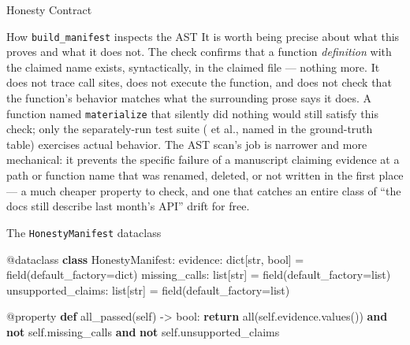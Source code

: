 \documentclass[
  ignorenonframetext,
]{beamer}
\newenvironment{Shaded}{}{}
\newcommand{\AttributeTok}[1]{\textcolor[rgb]{0.49,0.56,0.16}{#1}}
\newcommand{\BuiltInTok}[1]{\textcolor[rgb]{0.00,0.50,0.00}{#1}}
\newcommand{\ControlFlowTok}[1]{\textcolor[rgb]{0.00,0.44,0.13}{\textbf{#1}}}
\newcommand{\KeywordTok}[1]{\textcolor[rgb]{0.00,0.44,0.13}{\textbf{#1}}}
\newcommand{\NormalTok}[1]{#1}
\newcommand{\OperatorTok}[1]{\textcolor[rgb]{0.40,0.40,0.40}{#1}}
\newcommand{\VariableTok}[1]{\textcolor[rgb]{0.10,0.09,0.49}{#1}}
\begin{document}
\begin{frame}{Honesty Contract}
\begin{block}{How \texttt{build\_manifest} inspects the AST}
It is worth being precise about what this proves and what it does not.
The check confirms that a function \emph{definition} with the claimed
name exists, syntactically, in the claimed file --- nothing more. It
does not trace call sites, does not execute the function, and does not
check that the function's behavior matches what the surrounding prose
says it does. A function named \texttt{materialize} that silently did
nothing would still satisfy this check; only the separately-run test
suite ( et al., named in the ground-truth
table) exercises actual behavior. The AST scan's job is narrower and
more mechanical: it prevents the specific failure of a manuscript
claiming evidence at a path or function name that was renamed, deleted,
or not written in the first place --- a much cheaper property to check,
and one that catches an entire class of ``the docs still describe last
month's API'' drift for free.
\end{block}

\begin{block}{The \texttt{HonestyManifest} dataclass}
\protect{}\label{the-honestymanifest-dataclass}
\begin{Shaded}
\begin{Highlighting}[]
\AttributeTok{@dataclass}
\KeywordTok{class}\NormalTok{ HonestyManifest:}
\NormalTok{    evidence: }\BuiltInTok{dict}\NormalTok{[}\BuiltInTok{str}\NormalTok{, }\BuiltInTok{bool}\NormalTok{] }\OperatorTok{=}\NormalTok{ field(default\_factory}\OperatorTok{=}\BuiltInTok{dict}\NormalTok{)}
\NormalTok{    missing\_calls: }\BuiltInTok{list}\NormalTok{[}\BuiltInTok{str}\NormalTok{] }\OperatorTok{=}\NormalTok{ field(default\_factory}\OperatorTok{=}\BuiltInTok{list}\NormalTok{)}
\NormalTok{    unsupported\_claims: }\BuiltInTok{list}\NormalTok{[}\BuiltInTok{str}\NormalTok{] }\OperatorTok{=}\NormalTok{ field(default\_factory}\OperatorTok{=}\BuiltInTok{list}\NormalTok{)}

    \AttributeTok{@property}
    \KeywordTok{def}\NormalTok{ all\_passed(}\VariableTok{self}\NormalTok{) }\OperatorTok{{-}\textgreater{}} \BuiltInTok{bool}\NormalTok{:}
        \ControlFlowTok{return} \BuiltInTok{all}\NormalTok{(}\VariableTok{self}\NormalTok{.evidence.values()) }\KeywordTok{and} \KeywordTok{not} \VariableTok{self}\NormalTok{.missing\_calls }\KeywordTok{and} \KeywordTok{not} \VariableTok{self}\NormalTok{.unsupported\_claims}
\end{Highlighting}
\end{Shaded}


\end{block}
\end{frame}
\end{document}
